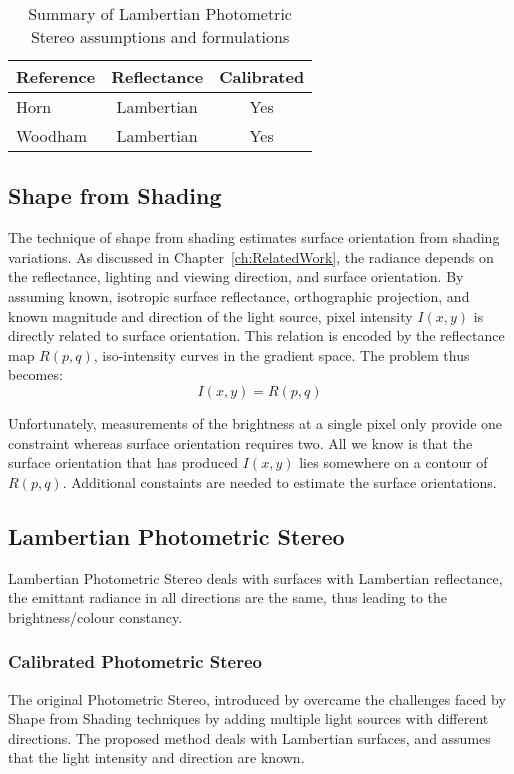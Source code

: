 \begin{table}[h]
  \centering
  \begin{tabular}{l*{2}{c}}
  \hline
  \textbf{Reference} & Reflectance & Calibrated \\
  \hline
  Horn~\cite{horn1989shape} & Lambertian & Yes\\
  Woodham~\cite{woodham1980photometric} & Lambertian & Yes\\
  \hline
  \end{tabular}
  \caption{Summary of Lambertian Photometric Stereo assumptions and formulations}
  \label{tab:class_1}
\end{table}

\subsection{Shape from Shading}
The technique of shape from shading estimates surface orientation from shading variations. As discussed in Chapter~\ref{ch:RelatedWork}, the radiance depends on the reflectance, lighting and viewing direction, and surface orientation. By assuming known, isotropic surface reflectance, orthographic projection, and known magnitude and direction of the light source, pixel intensity $I(x, y)$ is directly related to surface orientation. This relation is encoded by the reflectance map $R(p, q)$, \ie iso-intensity curves in the gradient space. The problem thus becomes:
$$
I(x, y) = R(p, q)
$$

Unfortunately, measurements of the brightness at a single pixel only provide one constraint whereas surface orientation requires two. All we know is that the surface orientation that has produced $I(x, y)$ lies somewhere on a contour of $R(p, q)$. Additional constaints are needed to estimate the surface orientations.

\subsection{Lambertian Photometric Stereo}
Lambertian Photometric Stereo deals with surfaces with Lambertian reflectance, \ie the emittant radiance in all directions are the same, thus leading to the brightness/colour constancy.

\subsubsection{Calibrated Photometric Stereo}
The original Photometric Stereo, introduced by \citeauthor{woodham1980photometric} overcame the challenges faced by Shape from Shading techniques by adding multiple light sources with different directions. The proposed method deals with Lambertian surfaces, and assumes that the light intensity and direction are known.

